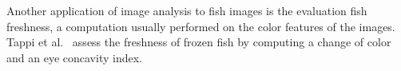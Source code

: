 \documentclass[conference]{IEEEtran}
\begin{document}
Another application of image analysis to fish images is the evaluation
fish freshness, a computation usually performed on the color features of
the images.
Tappi et al.~\cite{Tappi2017ComputerVS} assess the freshness of frozen
fish by computing a change of color and an eye concavity index.
\end{document}
